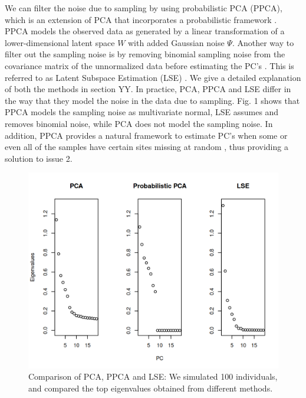 \documentclass[12pt, letterpaper]{article}
\begin{document}
We can filter the noise due to sampling by using probabilistic PCA (PPCA), which is an extension of PCA that incorporates a probabilistic framework \cite{tipping_probabilistic_nodate}. PPCA models the observed data as generated by a linear transformation of a lower-dimensional latent space $W$ with added Gaussian noise $\Psi$. Another way to filter out the sampling noise is by removing binomial sampling noise from the covariance matrix of the unnormalized data before estimating the PC's \cite{van_waaij_evaluation_2023,chen and storey, cabreros_likelihood-free_2019}. This is referred to as Latent Subspace Estimation (LSE) \cite{cabreros_likelihood-free_2019}. We give a detailed explanation of both the methods in section YY. In practice, PCA, PPCA and LSE differ in the way that they model the noise in the data due to sampling. Fig. 1 shows that PPCA models the sampling noise as multivariate normal, LSE assumes and removes binomial noise, while PCA does not model the sampling noise. In addition, PPCA provides a natural framework to estimate PC's when some or even all of the samples have certain sites missing at random \cite{tipping_probabilistic_nodate}, thus providing a solution to issue 2. 

\begin{figure}[ht!]
    \includegraphics[width=16.5cm]{plots/pca_all_genetic.png}
    \centering
    \caption{Comparison of PCA, PPCA and LSE: We simulated 100 individuals, and compared the top eigenvalues obtained from different methods.}
    \label{fig1:pca_ppca}
\end{figure}
\end{document}

